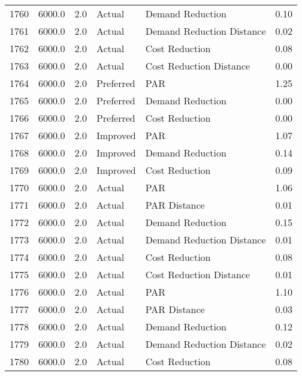 \begin{longtable}{lrrllr}
1760 &       6000.0 &     2.0 &         Actual &           Demand Reduction &   0.10 \\
1761 &       6000.0 &     2.0 &         Actual &  Demand Reduction Distance &   0.02 \\
1762 &       6000.0 &     2.0 &         Actual &             Cost Reduction &   0.08 \\
1763 &       6000.0 &     2.0 &         Actual &    Cost Reduction Distance &   0.00 \\
1764 &       6000.0 &     2.0 &      Preferred &                        PAR &   1.25 \\
1765 &       6000.0 &     2.0 &      Preferred &           Demand Reduction &   0.00 \\
1766 &       6000.0 &     2.0 &      Preferred &             Cost Reduction &   0.00 \\
1767 &       6000.0 &     2.0 &       Improved &                        PAR &   1.07 \\
1768 &       6000.0 &     2.0 &       Improved &           Demand Reduction &   0.14 \\
1769 &       6000.0 &     2.0 &       Improved &             Cost Reduction &   0.09 \\
1770 &       6000.0 &     2.0 &         Actual &                        PAR &   1.06 \\
1771 &       6000.0 &     2.0 &         Actual &               PAR Distance &   0.01 \\
1772 &       6000.0 &     2.0 &         Actual &           Demand Reduction &   0.15 \\
1773 &       6000.0 &     2.0 &         Actual &  Demand Reduction Distance &   0.01 \\
1774 &       6000.0 &     2.0 &         Actual &             Cost Reduction &   0.08 \\
1775 &       6000.0 &     2.0 &         Actual &    Cost Reduction Distance &   0.01 \\
1776 &       6000.0 &     2.0 &         Actual &                        PAR &   1.10 \\
1777 &       6000.0 &     2.0 &         Actual &               PAR Distance &   0.03 \\
1778 &       6000.0 &     2.0 &         Actual &           Demand Reduction &   0.12 \\
1779 &       6000.0 &     2.0 &         Actual &  Demand Reduction Distance &   0.02 \\
1780 &       6000.0 &     2.0 &         Actual &             Cost Reduction &   0.08 \\

\end{longtable}
